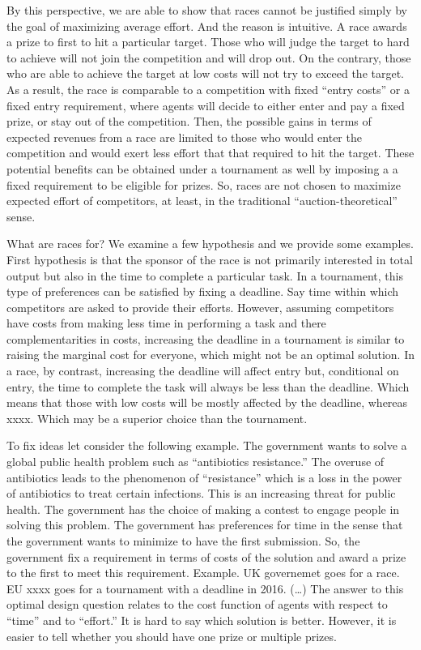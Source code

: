 By this perspective, we are able to show that races cannot be justified
simply by the goal of maximizing average effort. And the reason is
intuitive. A race awards a prize to first to hit a particular target.
Those who will judge the target to hard to achieve will not join the
competition and will drop out. On the contrary, those who are able to
achieve the target at low costs will not try to exceed the target. As a
result, the race is comparable to a competition with fixed ``entry
costs'' or a fixed entry requirement, where agents will decide to either
enter and pay a fixed prize, or stay out of the competition. Then, the
possible gains in terms of expected revenues from a race are limited to
those who would enter the competition and would exert less effort that
that required to hit the target. These potential benefits can be
obtained under a tournament as well by imposing a a fixed requirement to
be eligible for prizes. So, races are not chosen to maximize expected
effort of competitors, at least, in the traditional
``auction-theoretical'' sense.

What are races for? We examine a few hypothesis and we provide some
examples. First hypothesis is that the sponsor of the race is not
primarily interested in total output but also in the time to complete a
particular task. In a tournament, this type of preferences can be
satisfied by fixing a deadline. Say time within which competitors are
asked to provide their efforts. However, assuming competitors have costs
from making less time in performing a task and there complementarities
in costs, increasing the deadline in a tournament is similar to raising
the marginal cost for everyone, which might not be an optimal solution.
In a race, by contrast, increasing the deadline will affect entry but,
conditional on entry, the time to complete the task will always be less
than the deadline. Which means that those with low costs will be mostly
affected by the deadline, whereas xxxx. Which may be a superior choice
than the tournament.

To fix ideas let consider the following example. The government wants to
solve a global public health problem such as ``antibiotics resistance.''
The overuse of antibiotics leads to the phenomenon of ``resistance''
which is a loss in the power of antibiotics to treat certain infections.
This is an increasing threat for public health. The government has the
choice of making a contest to engage people in solving this problem. The
government has preferences for time in the sense that the government
wants to minimize to have the first submission. So, the government fix a
requirement in terms of costs of the solution and award a prize to the
first to meet this requirement. Example. UK governemet goes for a race.
EU xxxx goes for a tournament with a deadline in 2016. (\ldots{}) The
answer to this optimal design question relates to the cost function of
agents with respect to ``time'' and to ``effort.'' It is hard to say
which solution is better. However, it is easier to tell whether you
should have one prize or multiple prizes.

